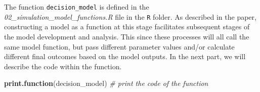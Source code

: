 \documentclass[]{book}
\newenvironment{Shaded}{\begin{snugshade}}{\end{snugshade}}
\newcommand{\KeywordTok}[1]{\textcolor[rgb]{0.13,0.29,0.53}{\textbf{#1}}}
\newcommand{\CommentTok}[1]{\textcolor[rgb]{0.56,0.35,0.01}{\textit{#1}}}
\newcommand{\NormalTok}[1]{#1}
\begin{document}
The function \texttt{decision\_model} is defined in the
\emph{02\_simulation\_model\_functions.R} file in the \texttt{R} folder.
As described in the paper, constructing a model as a function at this
stage facilitates subsequent stages of the model development and
analysis. This since these processes will all call the same model
function, but pass different parameter values and/or calculate different
final outcomes based on the model outputs. In the next part, we will
describe the code within the function.

\begin{Shaded}
\begin{Highlighting}[]
\KeywordTok{print.function}\NormalTok{(decision_model) }\CommentTok{# print the code of the function}
\end{Highlighting}
\end{Shaded}
\end{document}

